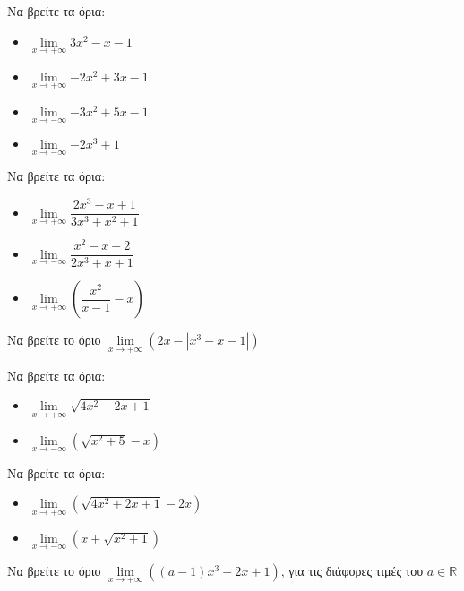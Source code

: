 \documentclass{presentation}
\begin{document}
\begin{askisi}
  Να βρείτε τα όρια:
  \begin{itemize}
    \item $\lim\limits_{x \to +\infty}{ 3x^2-x-1 }$ \pause
    \item $\lim\limits_{x \to +\infty}{ -2x^2+3x-1 }$ \pause
    \item $\lim\limits_{x \to -\infty}{ -3x^2+5x-1 }$ \pause
    \item $\lim\limits_{x \to -\infty}{ -2x^3+1 }$
  \end{itemize}
\end{askisi}

\begin{askisi}
  Να βρείτε τα όρια:
  \begin{itemize}
    \item $\lim\limits_{x \to +\infty}{ \dfrac{2x^3-x+1}{3x^3+x^2+1} }$ \pause
    \item $\lim\limits_{x \to -\infty}{ \dfrac{x^2-x+2}{2x^3+x+1} }$ \pause
    \item $\lim\limits_{x \to +\infty}{ \left( \dfrac{x^2}{x-1}-x  \right)  }$
  \end{itemize}
\end{askisi}

\begin{askisi}
  Να βρείτε το όριο $\lim\limits_{x \to +\infty}{ \left( 2x-|x^3-x-1| \right)  }$
\end{askisi}

\begin{askisi}
  Να βρείτε τα όρια:
  \begin{itemize}
    \item $\lim\limits_{x \to +\infty}{ \sqrt{4x^2-2x+1} }$ \pause
    \item $\lim\limits_{x \to -\infty}{ \left( \sqrt{x^2+5} -x \right)  }$
  \end{itemize}
\end{askisi}

\begin{askisi}
  Να βρείτε τα όρια:
  \begin{itemize}
    \item $\lim\limits_{x \to +\infty}{ \left( \sqrt{4x^2+2x+1}-2x \right)  }$ \pause
    \item $\lim\limits_{x \to -\infty}{ \left( x+ \sqrt{x^2+1} \right)  }$
  \end{itemize}
\end{askisi}

\begin{askisi}
  Να βρείτε το όριο $\lim\limits_{x \to +\infty}{ \left( (a-1)x^3-2x+1 \right)  }$, για τις διάφορες τιμές του $a\in\mathbb{R}$
\end{askisi}
\end{document}
